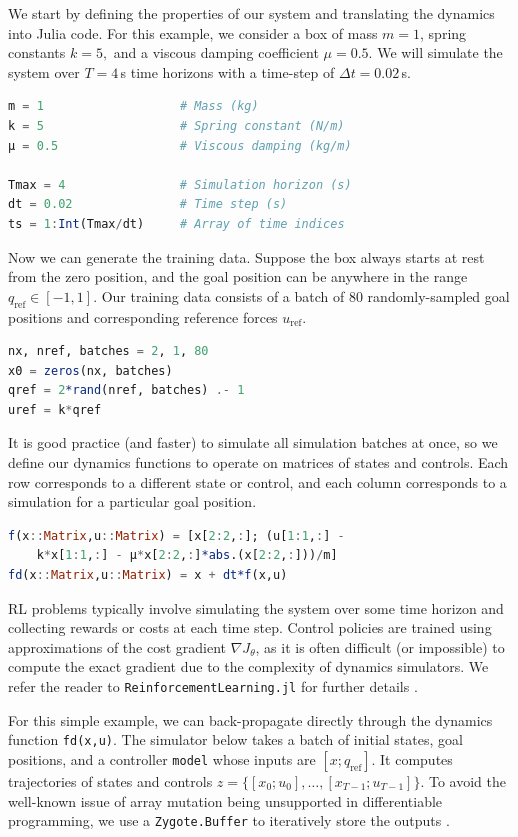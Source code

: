 We start by defining the properties of our system and translating the dynamics into Julia code. For this example, we consider a box of mass $m=1$, spring constants $k=5,$ and a viscous damping coefficient $\mu = 0.5$. We will simulate the system over $T = 4$\,s time horizons with a time-step of $\Delta t = 0.02$\,s.

\begin{lstlisting}[language = Julia]
m = 1                   # Mass (kg)
k = 5                   # Spring constant (N/m)
μ = 0.5                 # Viscous damping (kg/m)

Tmax = 4                # Simulation horizon (s)
dt = 0.02               # Time step (s)
ts = 1:Int(Tmax/dt)     # Array of time indices
\end{lstlisting}

Now we can generate the training data. Suppose the box always starts at rest from the zero position, and the goal position can be anywhere in the range $q_\mathrm{ref} \in [-1,1]$. Our training data consists of a batch of 80 randomly-sampled goal positions and corresponding reference forces $u_\mathrm{ref}$.
\begin{lstlisting}[language = Julia]
nx, nref, batches = 2, 1, 80
x0 = zeros(nx, batches)
qref = 2*rand(nref, batches) .- 1
uref = k*qref
\end{lstlisting}

It is good practice (and faster) to simulate all simulation batches at once, so we define our dynamics functions to operate on matrices of states and controls. Each row corresponds to a different state or control, and each column corresponds to a simulation for a particular goal position.

\begin{lstlisting}[language = Julia]
f(x::Matrix,u::Matrix) = [x[2:2,:]; (u[1:1,:] - 
    k*x[1:1,:] - μ*x[2:2,:]*abs.(x[2:2,:]))/m]
fd(x::Matrix,u::Matrix) = x + dt*f(x,u)
\end{lstlisting}

RL problems typically involve simulating the system over some time horizon and collecting rewards or costs at each time step. Control policies are trained using approximations of the cost gradient $\nabla J_\theta$, as it is often difficult (or impossible) to compute the exact gradient due to the complexity of dynamics simulators. We refer the reader to \verb|ReinforcementLearning.jl| for further details \cite{Tian++2020}.

For this simple example, we can back-propagate directly through the dynamics function \verb|fd(x,u)|. The simulator below takes a batch of initial states, goal positions, and a controller \verb|model| whose inputs are $[x; q_\mathrm{ref}]$. It computes trajectories of states and controls $z = \{[x_0;u_0], \ldots, [x_{T-1};u_{T-1}]\}$. To avoid the well-known issue of array mutation being unsupported in differentiable programming, we use a \verb|Zygote.Buffer| to iteratively store the outputs \cite{Innes2018b}.

